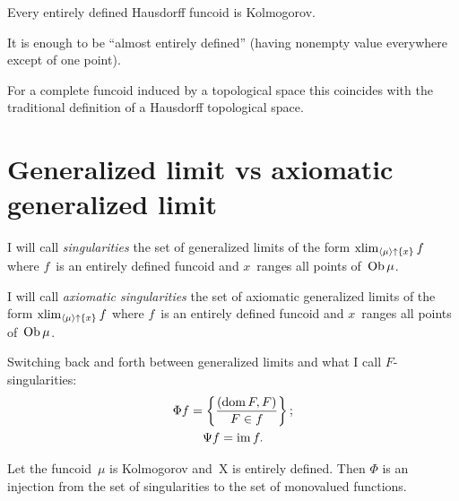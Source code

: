 \begin{cor}
Every entirely defined Hausdorff funcoid is Kolmogorov.
\end{cor}

\begin{rem}
It is enough to be ``almost entirely defined'' (having nonempty
value everywhere except of one point).
\end{rem}

\begin{obvious}
For a complete funcoid induced by a topological space this
coincides with the traditional definition of a Hausdorff
topological space.
\end{obvious}

\chapter{Generalized limit vs axiomatic generalized limit}

I will call \emph{singularities} the set of generalized limits of the form $\operatorname{xlim}_{\left\langle \mu\right\rangle\uparrow\{x\}}f$ where $f$~is an entirely defined funcoid and $x$~ranges all points of~$\operatorname{Ob}\mu$.

I will call \emph{axiomatic singularities} the set of axiomatic generalized limits of the form $\operatorname{xlim}_{\left\langle \mu\right\rangle\uparrow\{x\}}f$ where $f$~is an entirely defined funcoid and $x$~ranges all points of~$\operatorname{Ob}\mu$.

Switching back and forth between generalized limits and what I call $F$-singularities:
\begin{gather*}
\Phi f =\left\{ \frac{(\operatorname{dom} F, F)}{F \in f}\right\};\\
\Psi f = \operatorname{im} f.
\end{gather*}

\begin{prop}
Let the funcoid~$\mu$ is Kolmogorov and~$\mathrm{X}$ is entirely defined. Then $\Phi$ is an injection from the set of singularities to the set of monovalued functions.
\end{prop}

